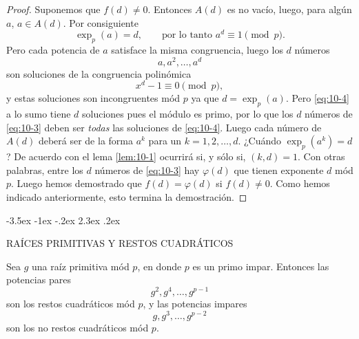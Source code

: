 \documentclass[12pt,a4paper]{book}
\makeatletter
\renewcommand\section{\@startsection{section}{1}{\z@}%
  {-3.5ex \@plus -1ex \@minus -.2ex}%
  {2.3ex \@plus .2ex}%
  {\normalfont\Large\bfseries\raggedright}}
\makeatother
\begin{document}
\begin{proof}
        Suponemos que $f(d)\neq0$. Entonces $A(d)$ es no vacío, luego, para algún $a$,
        $a\in A(d)$. Por consiguiente
        \begin{equation*}
            \exp_{p}(a)=d,\qquad\text{por lo tanto }a^{d}\equiv1\pmod{p}.
        \end{equation*}
        Pero cada potencia de $a$ satisface la misma congruencia, luego los $d$ números
        \begin{equation}\label{eq:10-3}
            a,a^{2},\dots,a^{d}
        \end{equation}
        son soluciones de la congruencia polinómica
        \begin{equation}\label{eq:10-4}
            x^{d}-1\equiv0\pmod{p},
        \end{equation}
        y estas soluciones son incongruentes mód $p$ ya que $d=\exp_{p}(a)$. Pero
        \eqref{eq:10-4} a lo sumo tiene $d$ soluciones pues el módulo es primo, por lo que
        los $d$ números de \eqref{eq:10-3} deben ser \textit{todas} las soluciones de
        \eqref{eq:10-4}. Luego cada número de $A(d)$ deberá ser de la forma $a^{k}$ para un
        $k=1,2,\dots,d$. ¿Cuándo $\exp_{p}(a^{k})=d$? De acuerdo con el lema
        \ref{lem:10-1} ocurrirá si, y sólo si, $(k,d)=1$. Con otras palabras, entre los $d$
        números de \eqref{eq:10-3} hay $\varphi(d)$ que tienen exponente $d$ mód $p$. Luego
        hemos demostrado que $f(d)=\varphi(d)$ si $f(d)\neq0$. Como hemos indicado
        anteriormente, esto termina la demostración.
    \end{proof}

    \section{RAÍCES PRIMITIVAS Y RESTOS CUADRÁTICOS}
    \begin{teorema}\label{teo:10-5}
        Sea $g$ una raíz primitiva mód $p$, en donde $p$ es un primo impar. Entonces las
        potencias pares
        \begin{equation*}
            g^{2},g^{4},\dots,g^{p-1}
        \end{equation*}
        son los restos cuadráticos mód $p$, y las potencias impares
        \begin{equation*}
            g,g^{3},\dots,g^{p-2}
        \end{equation*}
        son los no restos cuadráticos mód $p$.
    \end{teorema}
\end{document}
